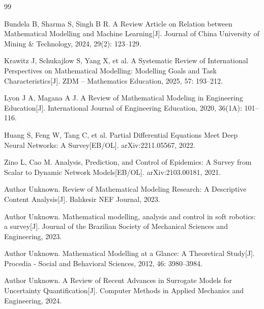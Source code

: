 \cite{Krawitz2025}


\newpage


\begin{thebibliography}{99}
	

	
	Bundela B, Sharma S, Singh B R.
	A Review Article on Relation between Mathematical Modelling and Machine Learning[J].
	Journal of China University of Mining \& Technology, 2024, 29(2): 123–129.
	
	Krawitz J, Schukajlow S, Yang X, et al. 
	A Systematic Review of International Perspectives on Mathematical Modelling: Modelling Goals and Task Characteristics[J]. 
	ZDM – Mathematics Education, 2025, 57: 193–212.
	
	
	
	
	
	Lyon J A, Magana A J.
	A Review of Mathematical Modeling in Engineering Education[J].
	International Journal of Engineering Education, 2020, 36(1A): 101–116.
	
	Huang S, Feng W, Tang C, et al.
	Partial Differential Equations Meet Deep Neural Networks: A Survey[EB/OL].
	arXiv:2211.05567, 2022.
	
	Zino L, Cao M.
	Analysis, Prediction, and Control of Epidemics: A Survey from Scalar to Dynamic Network Models[EB/OL].
	arXiv:2103.00181, 2021.
	
	Author Unknown.
	Review of Mathematical Modeling Research: A Descriptive Content Analysis[J].
	Balıkesir NEF Journal, 2023.
	
	Author Unknown.
	Mathematical modelling, analysis and control in soft robotics: a survey[J].
	Journal of the Brazilian Society of Mechanical Sciences and Engineering, 2023.
	
	Author Unknown.
	Mathematical Modelling at a Glance: A Theoretical Study[J].
	Procedia - Social and Behavioral Sciences, 2012, 46: 3980–3984.
	
	Author Unknown.
	A Review of Recent Advances in Surrogate Models for Uncertainty Quantification[J].
	Computer Methods in Applied Mechanics and Engineering, 2024.
	
\end{thebibliography}







